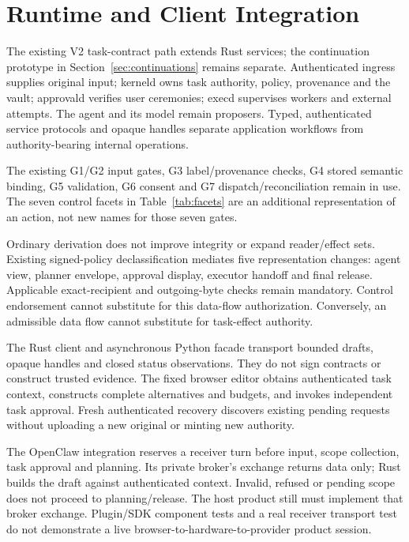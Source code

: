 \documentclass[letterpaper,twocolumn,10pt]{article}
\newcommand{\code}[1]{\texttt{\detokenize{#1}}}
\begin{document}
\section{Runtime and Client Integration}
\label{sec:implementation}

The existing V2 task-contract path extends Rust services; the continuation
prototype in Section~\ref{sec:continuations} remains separate. Authenticated
ingress supplies original input; kerneld
owns task authority, policy, provenance and the vault; approvald verifies user
ceremonies; execd supervises workers and external attempts. The agent and its
model remain proposers. Typed, authenticated service protocols and opaque handles
separate application workflows from authority-bearing internal operations.

The existing G1/G2 input gates, G3 label/provenance checks, G4 stored semantic
binding, G5 validation, G6 consent and G7 dispatch/reconciliation remain in use.
The seven control facets in Table~\ref{tab:facets} are an additional representation
of an action, not new names for those seven gates.

Ordinary derivation does not improve integrity or expand reader/effect sets.
Existing signed-policy declassification mediates five representation changes:
agent view, planner envelope, approval display, executor handoff and final
release. Applicable exact-recipient and outgoing-byte checks remain mandatory.
Control endorsement cannot substitute for this data-flow authorization.
Conversely, an admissible data flow cannot substitute for task-effect authority.

The Rust client and asynchronous Python facade transport bounded drafts,
opaque handles and closed status observations. They do not sign contracts or
construct trusted evidence. The fixed browser editor obtains authenticated task
context, constructs complete alternatives and budgets, and invokes independent
task approval. Fresh authenticated recovery discovers existing pending requests
without uploading a new original or minting new authority.

The OpenClaw integration reserves a receiver turn before input, scope collection,
task approval and planning. Its private broker's \code{task.draft} exchange
returns data only; Rust builds the draft against authenticated context.
Invalid, refused or pending scope does not proceed to planning/release.
The host product still must implement that broker exchange. Plugin/SDK component
tests and a real receiver transport test do not demonstrate a live
browser-to-hardware-to-provider product session.
\end{document}
